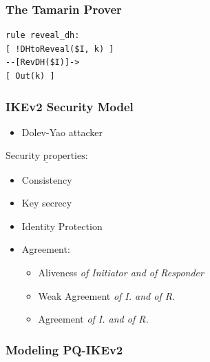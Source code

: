 \documentclass{beamer}
\begin{document}
\begin{frame}[fragile]
\frametitle{The Tamarin Prover}
\begin{lstlisting}[language=Tamarin]
rule reveal_dh:
[ !DHtoReveal($I, k) ] 
--[RevDH($I)]->       
[ Out(k) ]   
\end{lstlisting}
\end{frame}

\begin{frame}
\frametitle{IKEv2 Security Model}
\begin{itemize}
	\item Dolev-Yao attacker
\end{itemize}
\pause
\bigskip
$\underline{\text{Security properties:}}$              
\pause
\begin{itemize}	
	\item Consistency
	\pause
	\item Key secrecy
	\pause
	\item Identity Protection
	\pause
	\item Agreement: \smallskip
	\pause
	\begin{itemize}
		\item Aliveness \textit{of Initiator and of Responder} 
		\pause        
		\item Weak Agreement \textit{of I. and of R.}
		\pause
		\item Agreement\textit{ of I. and of R.}		
	\end{itemize}
	
\end{itemize}
\end{frame}

\begin{frame}
	\frametitle{Modeling PQ-IKEv2}
	
\end{frame}
\end{document}
